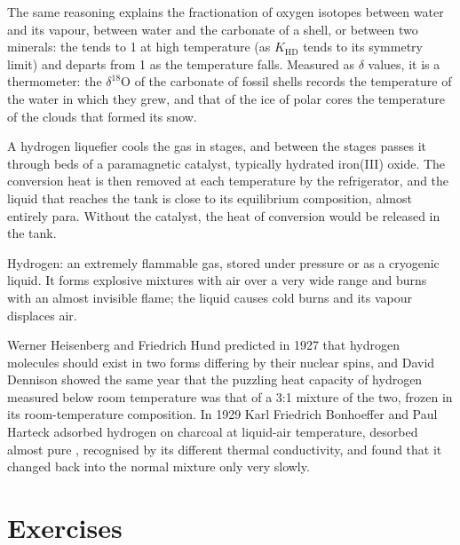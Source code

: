 The same reasoning explains the fractionation of oxygen isotopes between water
and its vapour, between water and the carbonate of a shell, or between two
minerals: the  tends to 1 at high temperature (as
$K_{\mathrm{HD}}$ tends to its symmetry limit) and departs from 1 as the temperature
falls. Measured as $\delta$ values, it is a thermometer: the $\delta^{18}$O of the carbonate
of fossil shells records the temperature of the water in which they grew, and
that of the ice of polar cores the temperature of the clouds that formed its
snow.

\begin{inthelab}
A hydrogen liquefier cools the gas in stages, and between the stages passes it
through beds of a paramagnetic catalyst, typically hydrated iron(III) oxide.
The conversion heat is then removed at each temperature by the refrigerator,
and the liquid that reaches the tank is close to its equilibrium composition,
almost entirely para. Without the catalyst, the heat of conversion would be
released in the tank.
\end{inthelab}

\begin{safety}{}
Hydrogen: an extremely flammable gas, stored under pressure or as a cryogenic
liquid. It forms explosive mixtures with air over a very wide range and burns
with an almost invisible flame; the liquid causes cold burns and its vapour
displaces air.
\end{safety}

\begin{history}
Werner Heisenberg and Friedrich Hund predicted in 1927 that hydrogen molecules
should exist in two forms differing by their nuclear spins, and David Dennison
showed the same year that the puzzling heat capacity of hydrogen measured
below room temperature was that of a 3:1 mixture of the two, frozen in its
room-temperature composition. In 1929 Karl Friedrich Bonhoeffer and Paul
Harteck adsorbed hydrogen on charcoal at liquid-air temperature, desorbed
almost pure , recognised by its different thermal conductivity,
and found that it changed back into the normal mixture only very slowly.
\end{history}

\section{Exercises}

